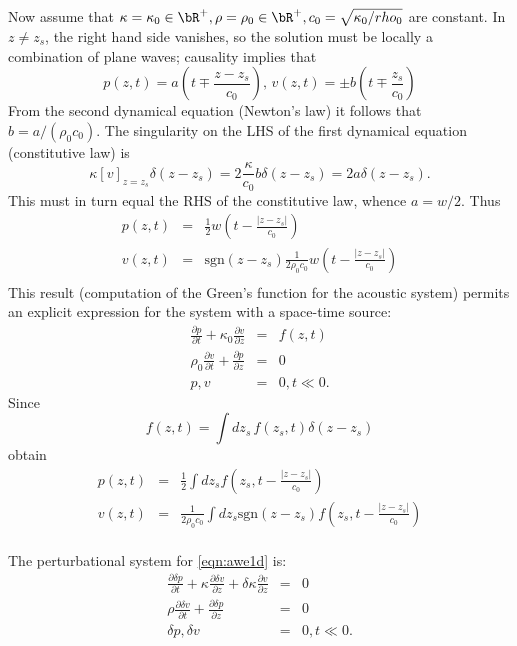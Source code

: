 Now assume that $\kappa=\kappa_0 \in \bR^+, \rho=\rho_0 \in \bR^+, c_0
= \sqrt{\kappa_0/rho_0}$ are constant. 
In $z \ne z_s$, the right hand side 
vanishes, so the solution must be locally a combination of plane
waves; causality implies that
\[
p(z,t)=a\left(t \mp \frac{z-z_s}{c_0}\right), \, v(z,t)=\pm b\left(t \mp
  \frac{z_s}{c_0}\right)
\]
From the second dynamical equation (Newton's law) it follows that $b =
a/(\rho_0 c_0)$. The singularity on the LHS of the first dynamical
equation (constitutive law) is
\[
\kappa [v]_{z=z_s}\delta(z-z_s) =
2\frac{\kappa}{c_0}b\delta(z-z_s) = 2a\delta(z-z_s).
\] 
This must in turn equal the RHS of the constitutive law, whence
$a=w/2$. Thus
\begin{eqnarray}
\label{eqn:sol1dptsrc}
p(z,t) &=& \frac{1}{2}w\left(t - \frac{|z-z_s|}{c_0}\right) \nonumber \\
v(z,t) &=& \mbox{sgn}(z-z_s)\frac{1}{2\rho_0 c_0}w\left(t -\frac{|z-z_s|}{c_0}\right)
           \nonumber \\
\end{eqnarray}
This result (computation of the Green's function for the acoustic
system) permits an explicit expression for the system with a
space-time source:
\begin{eqnarray}
\label{eqn:awe1d}
\frac{\partial p}{\partial t} +\kappa_0\frac{\partial 
  v}{\partial z} &=& f(z,t) \nonumber\\
\rho_0 \frac{\partial v}{\partial t} + \frac{\partial p}{\partial 
  z}&=&0\nonumber\\
 p,v&=&0, t \ll 0. 
\end{eqnarray}
Since
\[
  f(z,t) = \int dz_s\,f(z_s,t)\delta(z-z_s)
\]
obtain
\begin{eqnarray}
\label{eqn:sol1d}
p(z,t) &=& \frac{1}{2}\int dz_s f\left(z_s,t - \frac{|z-z_s|}{c_0}\right) \nonumber \\
v(z,t) &=& \frac{1}{2\rho_0 c_0} \int dz_s \mbox{sgn} (z-z_s) f\left(z_s,t - \frac{|z-z_s|}{c_0}\right)
           \nonumber \\
\end{eqnarray}


The perturbational system for \ref{eqn:awe1d} is:
\begin{eqnarray}
\label{eqn:dawe1d}
\frac{\partial \delta p}{\partial t} +\kappa\frac{\partial
  \delta v}{\partial z} + \delta \kappa\frac{\partial
  v}{\partial z} &=& 0 \nonumber\\
\rho \frac{\partial \delta v}{\partial t} + \frac{\partial \delta p}{\partial
  z}&=&0\nonumber\\
\delta p,\delta v&=&0, t \ll 0.
\end{eqnarray}

